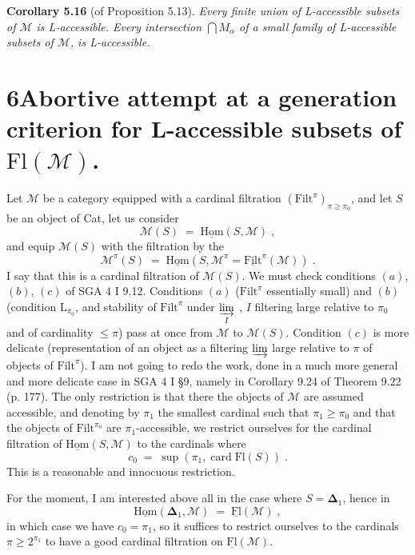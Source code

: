 \documentclass[11pt]{article}
\newcommand{\printedpage}[1]{\marginpar{\footnotesize p.~#1}}
\newcommand{\msp}[1]{\marginpar{\footnotesize [#1]}}
\newcommand{\Filt}{\mathrm{Filt}}
\newcommand{\Fl}{\mathrm{Fl}}
\newcommand{\card}{\operatorname{card}}
\newcommand{\uHom}{\underline{\mathrm{Hom}}}
\newcommand{\uFl}{\underline{\mathrm{Fl}}}
\begin{document}
\msp{page 73}
\textbf{Corollary 5.16} (of Proposition 5.13). \textit{Every finite union of L-accessible subsets of $\mathcal{M}$ is L-accessible. Every intersection $\bigcap M_{\alpha}$ of a small family of L-accessible subsets of $\mathcal{M}$, is L-accessible.}

\printedpage{41}

\section*{6\quad Abortive attempt at a generation criterion for L-accessible subsets of $\Fl(\mathcal{M})$.}

Let $\mathcal{M}$ be a category equipped with a cardinal filtration $(\Filt^{\pi})_{\pi\geq\pi_{0}}$, and let $S$ be an object of Cat, let us consider
\[
\mathcal{M}(S) \;=\; \uHom(S,\mathcal{M}) \; ,
\]
and equip $\mathcal{M}(S)$ with the filtration by the
\[
\mathcal{M}^{\pi}(S) \;=\; \uHom(S,\mathcal{M}^{\pi} = \underline{\Filt}^{\pi}(\mathcal{M})) \; .
\]
I say that this is a cardinal filtration of $\mathcal{M}(S)$. We must check conditions $(a)$, $(b)$, $(c)$ of SGA 4 I 9.12. Conditions $(a)$ ($\Filt^{\pi}$ essentially small) and $(b)$ (condition $\mathrm{L}_{\pi_{0}}$, and stability of $\Filt^{\pi}$ under $\varinjlim\limits_{I}$ , $I$ filtering large relative to $\pi_{0}$ and of cardinality $\leq \pi$) pass at once from $\mathcal{M}$ to $\mathcal{M}(S)$. Condition $(c)$ is more delicate (representation
\msp{page 74}
of an object as a filtering $\varinjlim$ large relative to $\pi$ of objects of $\Filt^{\pi}$). I am not going to redo the work, done in a much more general and more delicate case in SGA 4 I §9, namely in Corollary 9.24 of Theorem 9.22 (p. 177). The only restriction is that there the objects of $\mathcal{M}$ are assumed accessible, and denoting by $\pi_{1}$ the smallest cardinal such that $\pi_{1} \geq \pi_{0}$ and that the objects of $\Filt^{\pi_{0}}$ are $\pi_{1}$-accessible, we restrict ourselves for the cardinal filtration of $\uHom(S,\mathcal{M})$ to the cardinals  where
\[
c_{0} \;=\; \sup(\pi_{1}, \card \Fl(S)) \; .
\]
This is a reasonable and innocuous restriction.

For the moment, I am interested above all in the case where $S = \boldsymbol{\Delta}_{1}$, hence in
\[
\uHom(\boldsymbol{\Delta}_{1},\mathcal{M}) \;=\; \uFl(\mathcal{M}) \; ,
\]
in which case we have $c_{0} = \pi_{1}$, so it suffices to restrict ourselves to the cardinals $\pi \geq 2^{\pi_{1}}$ to have a good cardinal filtration on $\uFl(\mathcal{M})$.
\end{document}
